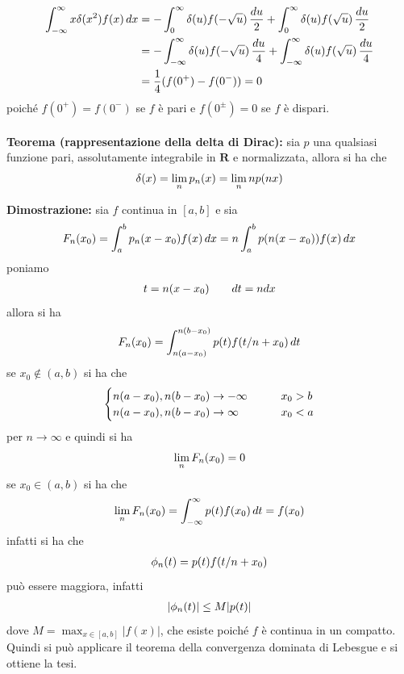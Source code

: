 \documentclass{article}
\begin{document}
\begin{align}
    \int_{-\infty}^{\infty} x\delta(x^2)f(x) \, dx &= -\int_0^\infty \delta(u)f(-\sqrt{u}) \, \frac{du}{2} + \int_0^\infty \delta(u)f(\sqrt{u}) \, \frac{du}{2} \notag \\
    &= -\int_{-\infty}^\infty \delta(u)f(-\sqrt{u}) \, \frac{du}{4} + \int_{-\infty}^\infty \delta(u)f(\sqrt{u}) \, \frac{du}{4} \notag \\
    &= \frac{1}{4}(f(0^+) - f(0^-)) = 0 \notag
\end{align}
poiché $f(0^+) = f(0^-)$ se $f$ è pari e $f(0^\pm) = 0$ se $f$ è dispari. \\ \\
\textbf{Teorema (rappresentazione della delta di Dirac):} sia $p$ una qualsiasi funzione pari, assolutamente integrabile in $\mathbf{R}$ e normalizzata, allora si ha che
\begin{gather}
    \delta(x) = \lim_n p_n(x) = \lim_n np(nx) \notag
\end{gather}

\textbf{Dimostrazione:} sia $f$ continua in $[a, b]$ e sia
\begin{align}
    F_n(x_0) = \int_a^b p_n(x - x_0)f(x) \, dx = n\int_a^b p(n(x - x_0))f(x) \, dx \notag
\end{align}
poniamo
\begin{gather}
    t = n(x - x_0) \qquad dt = ndx \notag
\end{gather}
allora si ha
\begin{align}
    F_n(x_0) = \int_{n(a - x_0)}^{n(b - x_0)}p(t)f(t/n + x_0) \, dt \notag
\end{align}
se $x_0 \not\in (a, b)$ si ha che
\begin{gather}
    \begin{cases}
        n(a - x_0), n(b - x_0) \rightarrow -\infty \qquad &x_0 > b \\
        n(a - x_0), n(b - x_0) \rightarrow \infty \qquad &x_0 < a
    \end{cases} \notag
\end{gather}
per $n \rightarrow \infty$ e quindi si ha
\begin{gather}
    \lim_n F_n(x_0) = 0 \notag
\end{gather}
se $x_0 \in (a, b)$ si ha che
\begin{gather}
    \lim_n F_n(x_0) = \int_{-\infty}^\infty p(t)f(x_0) \, dt = f(x_0) \notag
\end{gather}
infatti si ha che
\begin{gather}
    \phi_n(t) = p(t)f(t/n + x_0) \notag
\end{gather}
può essere maggiora, infatti
\begin{gather}
    |\phi_n(t)| \leq M|p(t)| \notag
\end{gather}
dove $M = \max_{x \in [a, b]}|f(x)|$, che esiste poiché $f$ è continua in un compatto. Quindi si può applicare il teorema della convergenza dominata di Lebesgue e si ottiene la tesi.
\end{document}
